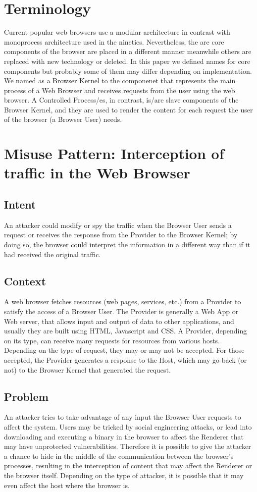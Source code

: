 \documentclass{sig-alternate-05-2015}
\begin{document}
\section{Terminology}
Current popular web browsers use a modular architecture in contrast with monoprocess architecture used in the nineties. Nevertheless, the are core components of the browser are placed in a different manner meanwhile others are replaced with new technology or deleted. In this paper we defined names for core components but probably some of them may differ depending on implementation. We named as a Browser Kernel to the componenet that represents the main process of a Web Browser and receives requests from the user using the web browser. A Controlled Process/es, in contrast, is/are slave components of the Browser Kernel, and they are used to render the content for each request the user of the browser (a Browser User) needs.

\section{Misuse Pattern: Interception of traffic in the Web Browser}
\subsection*{Intent}
An attacker could modify or spy the traffic when the Browser User sends a request or receives the response from the Provider to the Browser Kernel; by doing so, the browser could interpret the information in a different way than if it had received the original traffic.

\subsection*{Context}
A web browser fetches resources (web pages, services, etc.) from a Provider to satisfy the access of a Browser User. The Provider is generally a Web App or Web server, that allows input and output of data to other applications, and usually they are built using HTML, Javascript and CSS. A Provider, depending on its type, can receive many requests for resources from various hosts. Depending on the type of request, they may or may not be accepted. For those accepted, the Provider generates a response to the Host, which may go back (or not) to the Browser Kernel that generated the request.

\subsection*{Problem}
An attacker tries to take advantage of any input the Browser User requests to affect the system. Users may be tricked by social engineering attacks, or lead into downloading and executing a binary in the browser to affect the Renderer that may have unprotected vulnerabilities. Therefore it is possible to give the attacker a chance to hide in the middle of the communication between the browser's processes, resulting in the interception of content that may affect the Renderer or the browser itself. Depending on the type of attacker, it is possible that it may even affect the host where the browser is.
\end{document}
